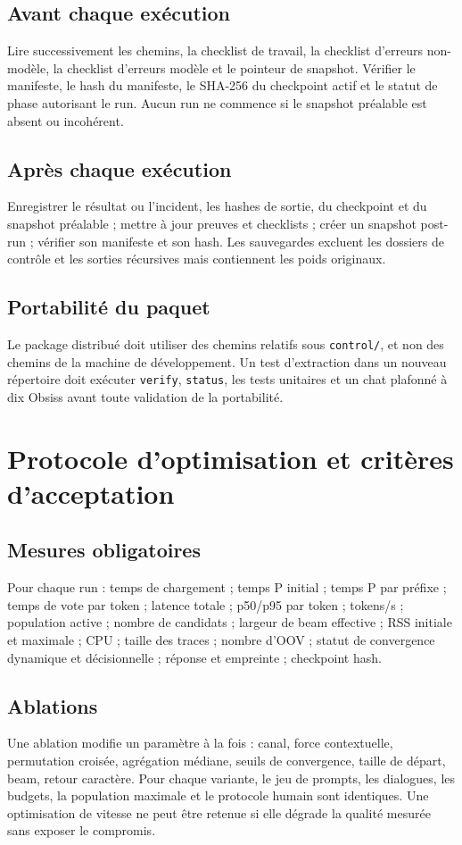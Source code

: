 \documentclass[11pt,a4paper]{report}
\begin{document}
\section{Avant chaque exécution}
Lire successivement les chemins, la checklist de travail, la checklist d'erreurs non-modèle, la checklist d'erreurs modèle et le pointeur de snapshot. Vérifier le manifeste, le hash du manifeste, le SHA-256 du checkpoint actif et le statut de phase autorisant le run. Aucun run ne commence si le snapshot préalable est absent ou incohérent.

\section{Après chaque exécution}
Enregistrer le résultat ou l'incident, les hashes de sortie, du checkpoint et du snapshot préalable ; mettre à jour preuves et checklists ; créer un snapshot post-run ; vérifier son manifeste et son hash. Les sauvegardes excluent les dossiers de contrôle et les sorties récursives mais contiennent les poids originaux.

\section{Portabilité du paquet}
Le package distribué doit utiliser des chemins relatifs sous \texttt{control/}, et non des chemins de la machine de développement. Un test d'extraction dans un nouveau répertoire doit exécuter \texttt{verify}, \texttt{status}, les tests unitaires et un chat plafonné à dix Obsiss avant toute validation de la portabilité.

\chapter{Protocole d'optimisation et critères d'acceptation}
\section{Mesures obligatoires}
Pour chaque run : temps de chargement ; temps P initial ; temps P par préfixe ; temps de vote par token ; latence totale ; p50/p95 par token ; tokens/s ; population active ; nombre de candidats ; largeur de beam effective ; RSS initiale et maximale ; CPU ; taille des traces ; nombre d'OOV ; statut de convergence dynamique et décisionnelle ; réponse et empreinte ; checkpoint hash.

\section{Ablations}
Une ablation modifie un paramètre à la fois : canal, force contextuelle, permutation croisée, agrégation médiane, seuils de convergence, taille de départ, beam, retour caractère. Pour chaque variante, le jeu de prompts, les dialogues, les budgets, la population maximale et le protocole humain sont identiques. Une optimisation de vitesse ne peut être retenue si elle dégrade la qualité mesurée sans exposer le compromis.
\end{document}
